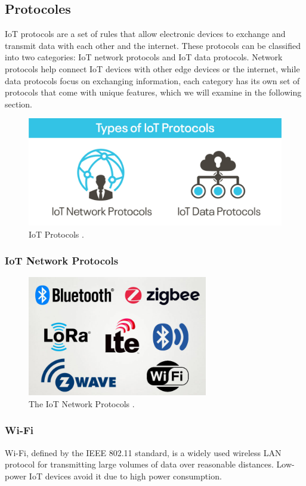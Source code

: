 \documentclass[12pt]{report}
\begin{document}
	\subsection{Protocoles}
	IoT protocols are a set of rules that allow electronic devices to exchange and transmit data with each other and the internet. These protocols can be classified into two categories: IoT network protocols and IoT data protocols. Network protocols help connect IoT devices with other edge devices or the internet, while data protocols focus on exchanging information, each category has its own set of protocols that come with unique features, which we will examine in the following section.\cite{particleIoT}
	\begin{figure}[H]
		\centering
		\includegraphics[width=1\textwidth]{iot-protocoles}
		\caption{IoT Protocols
			\cite{netburner}.}
		\label{fig:2protocoles}
	\end{figure}
	\subsubsection{IoT Network Protocols}
	\begin{figure}[H]
	\centering
	\includegraphics[width=0.7\textwidth]{network-protocol}
	\caption{The IoT Network Protocols
		\cite{iotdesignpro}.}
	\label{fig:NetworkProtocols}
\end{figure}
	\subsubsection*{Wi-Fi}
	Wi-Fi, defined by the IEEE 802.11 standard, is a widely used wireless LAN protocol for transmitting large volumes of data over reasonable distances. Low-power IoT devices avoid it due to high power consumption.
\end{document}
